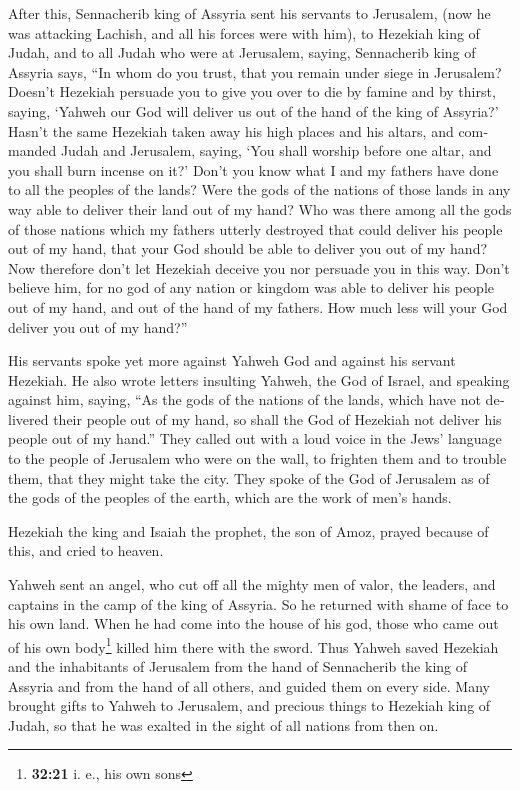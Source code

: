 \begin{paracol}{2}
\begin{otherlanguage}{english}
 After this, Sennacherib king of Assyria sent his servants
to Jerusalem, (now he was attacking Lachish, and all his forces were
with him), to Hezekiah king of Judah, and to all Judah who were at
Jerusalem, saying,  Sennacherib king of Assyria says,
``In whom do you trust, that you remain under siege in Jerusalem?
 Doesn't Hezekiah persuade you to give you over to die by
famine and by thirst, saying, `Yahweh our God will deliver us out of the
hand of the king of Assyria?'  Hasn't the same Hezekiah
taken away his high places and his altars, and commanded Judah and
Jerusalem, saying, `You shall worship before one altar, and you shall
burn incense on it?'  Don't you know what I and my
fathers have done to all the peoples of the lands? Were the gods of the
nations of those lands in any way able to deliver their land out of my
hand?  Who was there among all the gods of those nations
which my fathers utterly destroyed that could deliver his people out of
my hand, that your God should be able to deliver you out of my hand?
 Now therefore don't let Hezekiah deceive you nor
persuade you in this way. Don't believe him, for no god of any nation or
kingdom was able to deliver his people out of my hand, and out of the
hand of my fathers. How much less will your God deliver you out of my
hand?''

 His servants spoke yet more against Yahweh God and
against his servant Hezekiah.  He also wrote letters
insulting Yahweh, the God of Israel, and speaking against him, saying,
``As the gods of the nations of the lands, which have not delivered
their people out of my hand, so shall the God of Hezekiah not deliver
his people out of my hand.''  They called out with a loud
voice in the Jews' language to the people of Jerusalem who were on the
wall, to frighten them and to trouble them, that they might take the
city.  They spoke of the God of Jerusalem as of the gods
of the peoples of the earth, which are the work of men's hands.

 Hezekiah the king and Isaiah the prophet, the son of
Amoz, prayed because of this, and cried to heaven.

 Yahweh sent an angel, who cut off all the mighty men of
valor, the leaders, and captains in the camp of the king of Assyria. So
he returned with shame of face to his own land. When he had come into
the house of his god, those who came out of his own body\footnote{\textbf{32:21}
  i. e., his own sons} killed him there with the sword. 
Thus Yahweh saved Hezekiah and the inhabitants of Jerusalem from the
hand of Sennacherib the king of Assyria and from the hand of all others,
and guided them on every side.  Many brought gifts to
Yahweh to Jerusalem, and precious things to Hezekiah king of Judah, so
that he was exalted in the sight of all nations from then on.


\end{otherlanguage}
\end{paracol}
